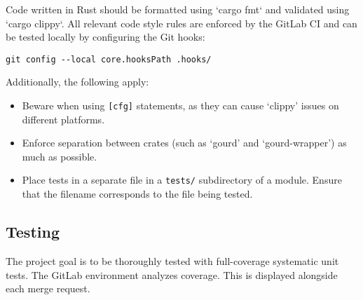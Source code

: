 Code written in Rust should be formatted using `cargo fmt` and validated using `cargo clippy`.
All relevant code style rules are enforced by the GitLab CI and can be tested locally
by configuring the Git hooks:
\begin{lstlisting}
git config --local core.hooksPath .hooks/
\end{lstlisting}

Additionally, the following apply:
\begin{itemize}
  \item Beware when using \verb|[cfg]| statements, as they can cause `clippy' issues on different platforms.
  \item Enforce separation between crates (such as `gourd' and `gourd-wrapper') as much as possible.
  \item Place tests in a separate file in a \verb|tests/| subdirectory of a module.
        Ensure that the filename corresponds to the file being tested.
\end{itemize}

\subsection{Testing}

The project goal is to be thoroughly tested with full-coverage systematic unit tests.
The GitLab environment analyzes coverage. This is displayed alongside each merge request.
